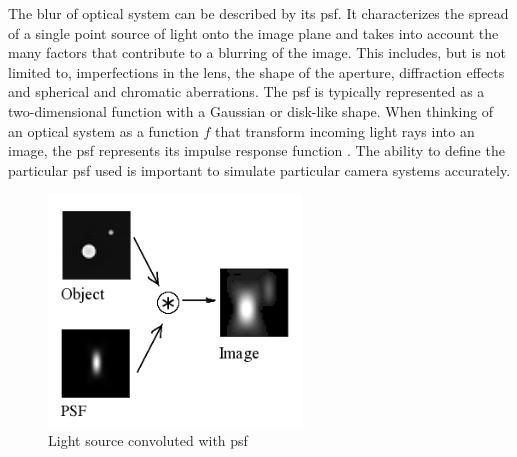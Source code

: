 The blur of optical system can be described by its \gls{psf}.
It characterizes the spread of a single point source of light onto the image plane and takes into account the many factors that contribute to a blurring of the image.
This includes, but is not limited to, imperfections in the lens, the shape of the aperture, diffraction effects and spherical and chromatic aberrations.
The \gls{psf} is typically represented as a two-dimensional function with a Gaussian or disk-like shape.
When thinking of an optical system as a function $f$ that transform incoming light rays into an image, the \gls{psf} represents its impulse response function \cite{Beyerer.2016}.
The ability to define the particular \gls{psf} used is important to simulate particular camera systems accurately.

\begin{figure}
    \centering
    \includegraphics[width=0.6\textwidth]{images/Convolution_Illustrated_eng.png}
    \caption{Light source convoluted with \gls{psf} \cite{psf}}
    \label{fig:psf}
\end{figure}

